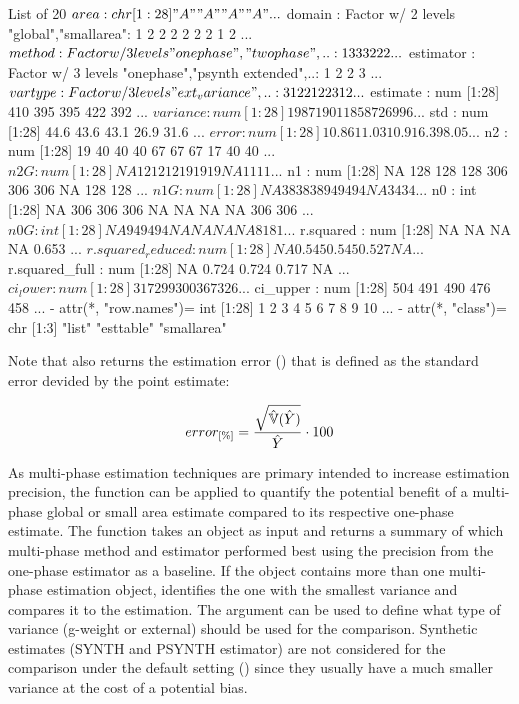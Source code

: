 \begin{small}
\begin{Schunk}
\begin{Sinput}
List of 20
 $ area             : chr [1:28] "A" "A" "A" "A" ...
 $ domain           : Factor w/ 2 levels "global","smallarea": 1 2 2 2 2 2 2 1 2  ...
 $ method           : Factor w/ 3 levels "onephase","twophase",..: 1 3 3 3 2 2 2  ...
 $ estimator        : Factor w/ 3 levels "onephase","psynth extended",..: 1 2 2 3 ...
 $ vartype          : Factor w/ 3 levels "ext_variance",..: 3 1 2 2 1 2 2 3 1 2 ...
 $ estimate         : num [1:28] 410 395 395 422 392 ...
 $ variance         : num [1:28] 1987 1901 1858 726 996 ...
 $ std              : num [1:28] 44.6 43.6 43.1 26.9 31.6 ...
 $ error            : num [1:28] 10.86 11.03 10.91 6.39 8.05 ...
 $ n2               : num [1:28] 19 40 40 40 67 67 67 17 40 40 ...
 $ n2G              : num [1:28] NA 12 12 12 19 19 19 NA 11 11 ...
 $ n1               : num [1:28] NA 128 128 128 306 306 306 NA 128 128 ...
 $ n1G              : num [1:28] NA 38 38 38 94 94 94 NA 34 34 ...
 $ n0               : int [1:28] NA 306 306 306 NA NA NA NA 306 306 ...
 $ n0G              : int [1:28] NA 94 94 94 NA NA NA NA 81 81 ...
 $ r.squared        : num [1:28] NA NA NA NA 0.653 ...
 $ r.squared_reduced: num [1:28] NA 0.545 0.545 0.527 NA ...
 $ r.squared_full   : num [1:28] NA 0.724 0.724 0.717 NA ...
 $ ci_lower         : num [1:28] 317 299 300 367 326 ...
 $ ci_upper         : num [1:28] 504 491 490 476 458 ...
 - attr(*, "row.names")= int [1:28] 1 2 3 4 5 6 7 8 9 10 ...
 - attr(*, "class")= chr [1:3] "list" "esttable" "smallarea"
\end{Sinput}
\end{Schunk}
\end{small}

Note that  also returns the estimation error () that is defined as the standard error devided by the point estimate:

\begin{equation}\label{eq:esterror}
  error_{[\%]}=\frac{\sqrt{\hat{\mathbb{V}}(\hat{Y})}}{\hat{Y}}\cdot100
\end{equation}

As multi-phase estimation techniques are primary intended to increase estimation precision, the function  can be applied to quantify the potential benefit of a multi-phase global or small area estimate compared to its respective one-phase estimate. The function takes an  object as input and returns a summary of which multi-phase method and estimator performed best using the precision from the one-phase estimator as a baseline. If the  object contains more than one multi-phase estimation object,  identifies the one with the smallest variance and compares it to the  estimation. The argument  can be used to define what type of variance (g-weight or external) should be used for the comparison. Synthetic estimates (SYNTH and PSYNTH estimator) are not considered for the comparison under the default setting () since they usually have a much smaller variance at the cost of a potential bias.

